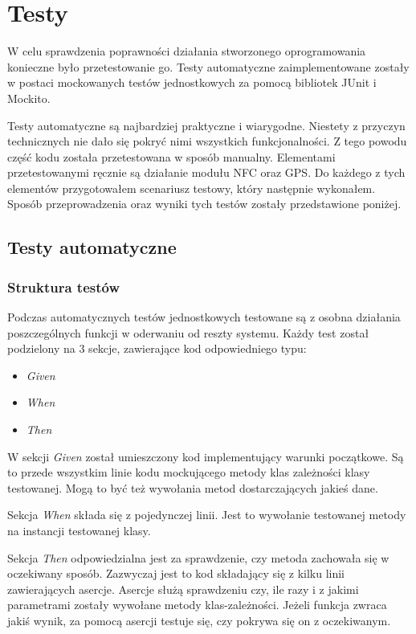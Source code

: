 \documentclass[openright]{xmgr}
\begin{document}
\chapter{Testy} 

W celu sprawdzenia poprawności działania stworzonego oprogramowania konieczne było przetestowanie go.  Testy automatyczne zaimplementowane zostały w postaci mockowanych testów jednostkowych za pomocą bibliotek JUnit i Mockito.

Testy automatyczne są najbardziej praktyczne i wiarygodne. Niestety z przyczyn technicznych nie dało się pokryć nimi wszystkich funkcjonalności. Z tego powodu część kodu została przetestowana w sposób manualny. Elementami przetestowanymi ręcznie są działanie modułu NFC oraz GPS. Do każdego z tych elementów przygotowałem scenariusz testowy, który następnie wykonałem. Sposób przeprowadzenia oraz wyniki tych testów zostały przedstawione poniżej.

\section{Testy automatyczne}
\subsection{Struktura testów}
Podczas  automatycznych testów jednostkowych testowane są z osobna działania poszczególnych funkcji w oderwaniu od reszty systemu. Każdy test został podzielony na 3 sekcje, zawierające kod odpowiedniego typu:
\begin{itemize}
\item \textit{Given}
\item \textit{When}
\item \textit{Then}
\end{itemize}

W sekcji \textit{Given} został umieszczony kod implementujący warunki początkowe. Są to przede wszystkim linie kodu mockującego metody klas zależności klasy testowanej. Mogą to być też wywołania metod dostarczających jakieś dane. 

Sekcja \textit{When} składa się z pojedynczej linii. Jest to wywołanie testowanej metody na instancji testowanej klasy.

Sekcja \textit{Then} odpowiedzialna jest za sprawdzenie, czy metoda zachowała się w oczekiwany sposób. Zazwyczaj jest to kod składający się z kilku linii zawierających asercje. Asercje służą sprawdzeniu czy, ile razy i z jakimi parametrami zostały wywołane metody klas-zależności. Jeżeli funkcja zwraca jakiś wynik, za pomocą asercji testuje się, czy pokrywa się on z oczekiwanym.
\end{document}
